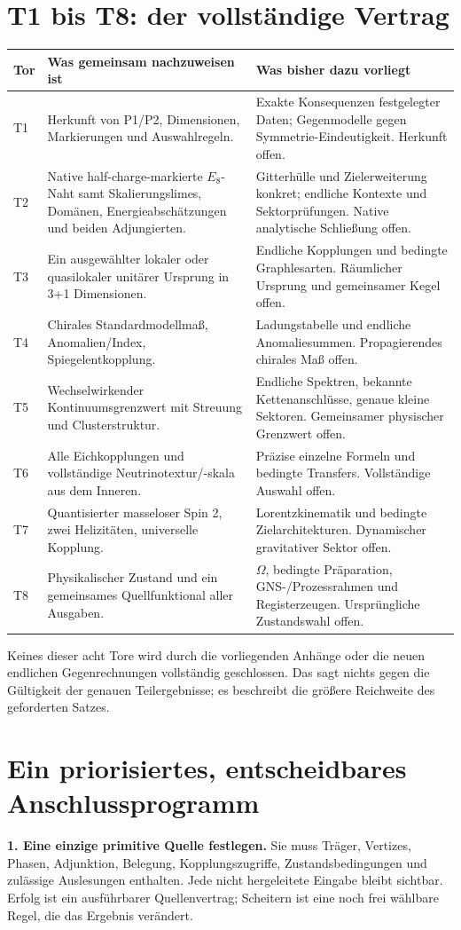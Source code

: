 \section{T1 bis T8: der vollständige Vertrag}
\begin{longtable}{L{9mm}L{62mm}L{79mm}}
\toprule \textbf{Tor}&\textbf{Was gemeinsam nachzuweisen ist}&\textbf{Was bisher dazu vorliegt}\\\midrule\endhead
T1&Herkunft von P1/P2, Dimensionen, Markierungen und Auswahlregeln.&Exakte Konsequenzen festgelegter Daten; Gegenmodelle gegen Symmetrie-Eindeutigkeit. Herkunft offen.\\
T2&Native half-charge-markierte $E_8$-Naht samt Skalierungslimes, Domänen, Energieabschätzungen und beiden Adjungierten.&Gitterhülle und Zielerweiterung konkret; endliche Kontexte und Sektorprüfungen. Native analytische Schließung offen.\\
T3&Ein ausgewählter lokaler oder quasilokaler unitärer Ursprung in 3+1 Dimensionen.&Endliche Kopplungen und bedingte Graphlesarten. Räumlicher Ursprung und gemeinsamer Kegel offen.\\
T4&Chirales Standardmodellmaß, Anomalien/Index, Spiegelentkopplung.&Ladungstabelle und endliche Anomaliesummen. Propagierendes chirales Maß offen.\\
T5&Wechselwirkender Kontinuumsgrenzwert mit Streuung und Clusterstruktur.&Endliche Spektren, bekannte Kettenanschlüsse, genaue kleine Sektoren. Gemeinsamer physischer Grenzwert offen.\\
T6&Alle Eichkopplungen und vollständige Neutrinotextur/-skala aus dem Inneren.&Präzise einzelne Formeln und bedingte Transfers. Vollständige Auswahl offen.\\
T7&Quantisierter masseloser Spin 2, zwei Helizitäten, universelle Kopplung.&Lorentzkinematik und bedingte Zielarchitekturen. Dynamischer gravitativer Sektor offen.\\
T8&Physikalischer Zustand und ein gemeinsames Quellfunktional aller Ausgaben.&$\Omega$, bedingte Präparation, GNS-/Prozessrahmen und Registerzeugen. Ursprüngliche Zustandswahl offen.\\\bottomrule
\end{longtable}
Keines dieser acht Tore wird durch die vorliegenden Anhänge oder die neuen endlichen Gegenrechnungen vollständig geschlossen. Das sagt nichts gegen die Gültigkeit der genauen Teilergebnisse; es beschreibt die größere Reichweite des geforderten Satzes.

\section{Ein priorisiertes, entscheidbares Anschlussprogramm}
\textbf{1. Eine einzige primitive Quelle festlegen.} Sie muss Träger, Vertizes, Phasen, Adjunktion, Belegung, Kopplungszugriffe, Zustandsbedingungen und zulässige Auslesungen enthalten. Jede nicht hergeleitete Eingabe bleibt sichtbar. Erfolg ist ein ausführbarer Quellenvertrag; Scheitern ist eine noch frei wählbare Regel, die das Ergebnis verändert.

